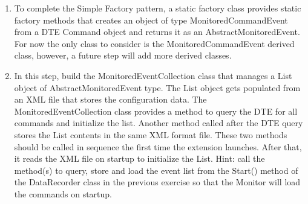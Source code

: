 \begin{enumerate}
 The constructor that takes a Command as input, simply extracts the necessary and relevant fields from the DTE's Command object and transferrs the matching information into the corresponding fields from this class and the AbstractMonitoredEvent class.  


\begin{lstlisting}
    [XmlRoot(ElementName = "MonitoredEvent", Namespace = "http://Monitor")]
    public class MonitoredCommandEvent : AbstractMonitoredEvent {

         public int EventID { get; set; }
        public String Guid { get; set; }

        public MonitoredCommandEvent()
        {
        }

        public MonitoredCommandEvent(Command DTECommandObj) {
            if (DTECommandObj != null) {
                this.EventName = DTECommandObj.Name;
                this.Classification = EventName.Split('.')[0];  //use the first part of event name
                this.Guid = DTECommandObj.Guid;
                this.EventID = DTECommandObj.ID;
            }
            else {
                throw new ArgumentNullException("DTECommandObj");
            }
        }
\end{lstlisting}

 The attribute for XMLRoot is the same attribute assigned to the AbstractMonitoredEvent class which tells XML Serialization that this type is a type beloging to the abstract class.  In this class, create two public fields, EventID as int and GUID as string, that will save important information from the Visual Studio DTE object needed to engage monitoring for each command.  

\item
To complete the Simple Factory pattern, a static factory class provides static factory methods that creates an object of type  MonitoredCommandEvent from a DTE Command object and returns it as an AbstractMonitoredEvent.  For now the only class to consider is the MonitoredCommandEvent derived class, however, a future step will add more derived classes.  

\item
In this step, build the MonitoredEventCollection class that manages a List object of AbstractMonitoredEvent type.  The List object gets populated from an XML file that stores the configuration data.  The MonitoredEventCollection class provides a method to query the DTE for all commands and initialize the list.  Another method called after the DTE query stores the List contents in the same XML format file.  These two methods should be called in sequence the first time the extension launches. After that, it  reads the XML file on startup to initialize the List.  Hint: call the method(s) to query, store and load the event list from the Start() method of the DataRecorder class in the previous exercise so that the Monitor will load the commands on startup.


\end{enumerate}

